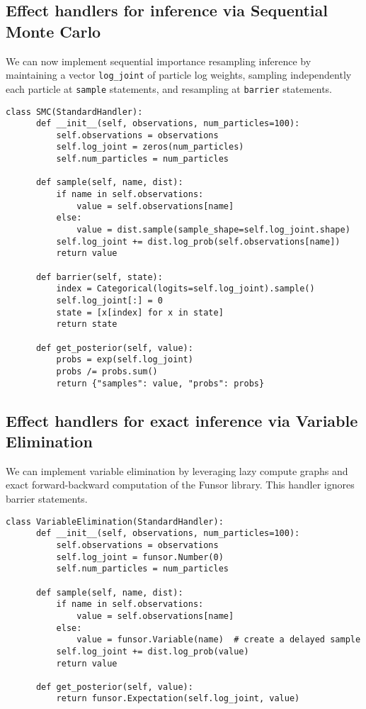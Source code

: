 \documentclass[anonymous=false, %
               format=acmsmall, %
               review=true, %
               screen=true, %
               nonacm=true]{acmart}
\begin{document}
\subsection{Effect handlers for inference via Sequential Monte Carlo}
\label{sec:appendix:smc}
We can now implement sequential importance resampling inference by maintaining a vector \verb$log_joint$ of particle log weights, sampling independently each particle at \verb$sample$ statements, and resampling at \verb$barrier$ statements.
\begin{Verbatim}[samepage=true]
  class SMC(StandardHandler):
      def __init__(self, observations, num_particles=100):
          self.observations = observations
          self.log_joint = zeros(num_particles)
          self.num_particles = num_particles
  
      def sample(self, name, dist):
          if name in self.observations:
              value = self.observations[name]
          else:
              value = dist.sample(sample_shape=self.log_joint.shape)
          self.log_joint += dist.log_prob(self.observations[name])
          return value
  
      def barrier(self, state):
          index = Categorical(logits=self.log_joint).sample()
          self.log_joint[:] = 0
          state = [x[index] for x in state]
          return state
  
      def get_posterior(self, value):
          probs = exp(self.log_joint)
          probs /= probs.sum()
          return {"samples": value, "probs": probs}
\end{Verbatim}

\subsection{Effect handlers for exact inference via Variable Elimination}
We can implement variable elimination by leveraging lazy compute graphs and exact forward-backward computation of the Funsor library.
This handler ignores barrier statements.
\label{sec:appendix:exact}
\begin{Verbatim}[samepage=true]
  class VariableElimination(StandardHandler):
      def __init__(self, observations, num_particles=100):
          self.observations = observations
          self.log_joint = funsor.Number(0)
          self.num_particles = num_particles

      def sample(self, name, dist):
          if name in self.observations:
              value = self.observations[name]
          else:
              value = funsor.Variable(name)  # create a delayed sample
          self.log_joint += dist.log_prob(value)
          return value

      def get_posterior(self, value):
          return funsor.Expectation(self.log_joint, value)
\end{Verbatim}
\end{document}
